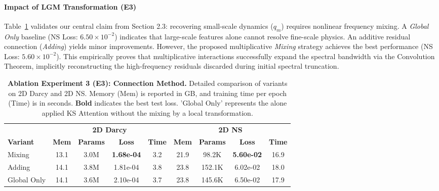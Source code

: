 \documentclass[final,3p,times]{elsarticle}
\begin{document}
\paragraph{Impact of LGM Transformation (E3)}
Table~\ref{tab:ablation_e3} validates our central claim from Section 2.3: recovering small-scale dynamics ($q_m$) requires nonlinear frequency mixing. A \textit{Global Only} baseline (NS Loss: $6.50 \times 10^{-2}$) indicates that large-scale features alone cannot resolve fine-scale physics. An additive residual connection (\textit{Adding}) yields minor improvements. However, the proposed multiplicative \textit{Mixing} strategy achieves the best performance (NS Loss: $5.60 \times 10^{-2}$). This empirically proves that multiplicative interactions successfully expand the spectral bandwidth via the Convolution Theorem, implicitly reconstructing the high-frequency residuals discarded during initial spectral truncation.
\begin{table}[htbp]
  \centering
  \small
  \setlength{\tabcolsep}{4pt}
  \renewcommand{\arraystretch}{1.2}
  \caption{\textbf{Ablation Experiment 3 (E3): Connection Method.} Detailed comparison of variants on 2D Darcy and 2D NS. Memory (Mem) is reported in GB, and training time per epoch (Time) is in seconds. \textbf{Bold} indicates the best test loss. 'Global Only' represents the alone applied KS Attention without the mixing by a local transformation.}
  \label{tab:ablation_e3}
  \begin{tabular}{l c c c c c c c c}
    \toprule
    & \multicolumn{4}{c}{\textbf{2D Darcy}} & \multicolumn{4}{c}{\textbf{2D NS}} \\
    \cmidrule(lr){2-5} \cmidrule(lr){6-9}
    \textbf{Variant} & \textbf{Mem} & \textbf{Params} & {\textbf{Loss}} & \textbf{Time} & \textbf{Mem} & \textbf{Params} & {\textbf{Loss}} & \textbf{Time} \\
    \midrule
    Mixing & 13.1 & 3.0M & {\textbf{1.68e-04}} & 3.2 & 21.9 & 98.2K & {\textbf{5.60e-02}} & 16.9 \\
    Adding & 14.1 & 3.8M & 1.81e-04 & 3.8 & 23.8 & 152.1K & 6.02e-02 & 18.0 \\
    Global Only & 14.1 & 3.6M & 2.10e-04 & 3.7 & 23.8 & 145.6K & 6.50e-02 & 17.9 \\
    \bottomrule
  \end{tabular}
\end{table}
\end{document}
